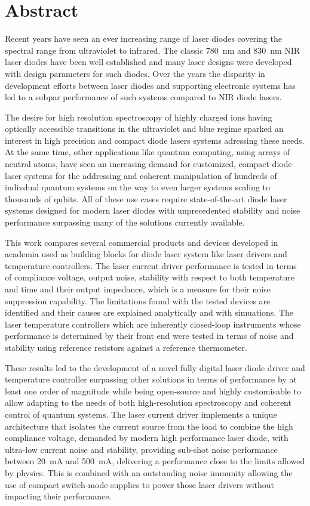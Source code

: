 \section*{Abstract}
Recent years have seen an ever increasing range of laser diodes covering the spectral range from ultraviolet to infrared. The classic \qty{780}{\nm} and \qty{830}{\nm} NIR laser diodes have been well established and many laser designs were developed with design parameters for such diodes. Over the years the disparity in development efforts between laser diodes and supporting electronic systems has led to a subpar performance of such systems compared to NIR diode lasers.

The desire for high resolution spectroscopy of highly charged ions having optically accessible transitions in the ultraviolet and blue regime sparked an interest in high precision and compact diode lasers systems adressing these needs. At the same time, other applications like quantum computing, using arrays of neutral atoms, have seen an increasing demand for customized, compact diode laser systems for the addressing and coherent manipulation of hundreds of indivdual quantum systems on the way to even larger systems scaling to thousands of qubits. All of these use cases require state-of-the-art diode laser systems designed for modern laser diodes with unprecedented stability and noise performance surpassing many of the solutions currently available.

This work compares several commercial products and devices developed in academia used as building blocks for diode laser system like laser drivers and temperature controllers. The laser current driver performance is tested in terms of compliance voltage, output noise, stability with respect to both temperature and time and their output impedance, which is a measure for their noise suppression capability. The limitations found with the tested devices are identified and their causes are explained analytically and with simuations. The laser temperature controllers which are inherently closed-loop instruments whose performance is determined by their front end were tested in terms of noise and stability using reference resistors against a reference thermometer.

These results led to the development of a novel fully digital laser diode driver and temperature controller surpassing other solutions in terms of performance by at least one order of magnitude while being open-source and highly customisable to allow adapting to the needs of both high-resolution spectroscopy and coherent control of quantum systems. The laser current driver implements a unique architecture that isolates the current source from the load to combine the high compliance voltage, demanded by modern high performance laser diode, with ultra-low current noise and stability, providing sub-shot noise performance between \qty{20}{\mA} and \qty{500}{\mA}, delivering a performance close to the limits allowed by physics. This is combined with an outstanding noise immunity allowing the use of compact switch-mode supplies to power those laser drivers without impacting their performance.

